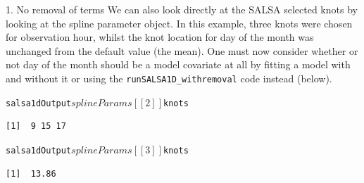 \begin{block}{1. No removal of terms}
\noindent We can also look directly at the SALSA selected knots by looking at the spline parameter object.  In this example, three knots were chosen for observation hour, whilst the knot location for day of the month was unchanged from the default value (the mean).  One must now consider whether or not day of the month should be a model covariate at all by fitting a model with and without it or using the {\tt runSALSA1D\_withremoval} code instead (below).

\begin{knitrout}\footnotesize
{}\color{fgcolor}\begin{kframe}
\begin{alltt}
salsa1dOutput$splineParams[[2]]$knots
\begin{verbatim}
[1]  9 15 17
\end{verbatim}
salsa1dOutput$splineParams[[3]]$knots
\begin{verbatim}
[1]  13.86
\end{verbatim}
\end{alltt}
\end{kframe}
\end{knitrout}
\end{block}

